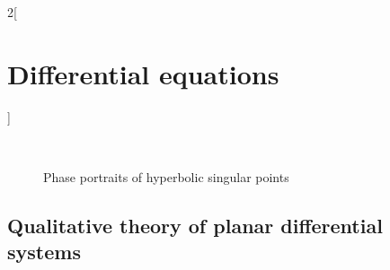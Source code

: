 \documentclass[../../../main_math.tex]{subfiles}
\begin{document}
\begin{multicols}{2}[\section{Differential equations}]
\begin{figure}[H]
\begin{subfigure}[b]{0.3\linewidth}
      \caption{}
      \label{DE_linear-h}
    \end{subfigure}
    \hfill
    \begin{subfigure}[b]{0.3\linewidth}
      \centering
      
      \caption{}
      \label{DE_linear-i}
    \end{subfigure}\\
    \begin{subfigure}[b]{0.3\linewidth}
      \centering
      
      \caption{}
      \label{DE_linear-j}
    \end{subfigure}
    \caption{Phase portraits of hyperbolic singular points}
  \end{figure}
  \subsection{Qualitative theory of planar differential systems}

\end{multicols}
\end{document}
